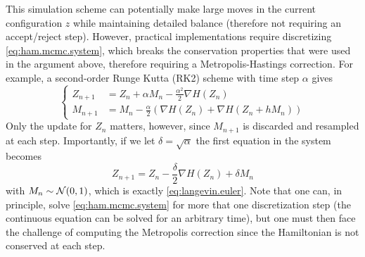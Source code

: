 This simulation scheme can potentially make large moves in the current configuration $z$ while maintaining detailed balance (therefore not requiring an accept/reject step). However, practical implementations require discretizing \cref{eq:ham.mcmc.system}, which breaks the conservation properties that were used in the argument above, therefore requiring a Metropolis-Hastings correction. For example, a second-order Runge Kutta (RK2) scheme with time step $\alpha$ gives 
\[
\left\{
\begin{aligned}
Z_{n+1} &= Z_n + \alpha M_n - \frac{\alpha^2}{2} \nabla H(Z_n)\\
M_{n+1} &= M_n - \frac{\alpha}{2}(\nabla H(Z_n) + \nabla H(Z_n + hM_n))
\end{aligned}
\right.
\]
Only the update for $Z_n$ matters, however, since $M_{n+1}$ is discarded and resampled at each step. Importantly, if we let $\delta = \sqrt \alpha$ the first equation in the system becomes 
\[
Z_{n+1} = Z_n  - \frac{\delta}{2} \nabla H(Z_n) + \delta M_n
\]
with $M_n \sim {\mathcal N}(0,1)$, which is exactly \cref{eq:langevin.euler}.  Note that one can, in principle, solve \cref{eq:ham.mcmc.system} for more that one discretization step (the continuous equation can be solved for an arbitrary time), but one must then face the challenge of computing the Metropolis correction since the Hamiltonian is not conserved at each step.


